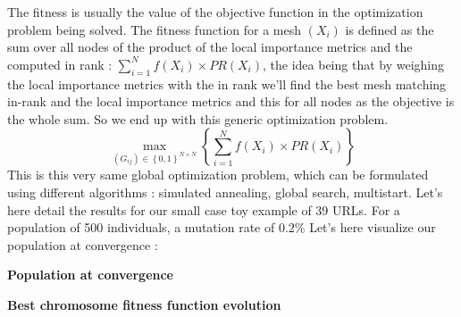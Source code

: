 \documentclass{iSWAGArticle}
\begin{document}
The fitness is usually the value of the objective function in the optimization problem being solved.
The fitness function for a mesh $\left(X_i\right)$ is defined as the sum over all nodes of the product of the local importance metrics
and the computed in rank : $\sum^{N}_{i=1} f\left(X_i\right)\times PR(X_i)$, the idea being that by weighing the local importance metrics with the in rank
we'll find the best mesh matching in-rank and the local importance metrics and this for all nodes as the objective is the whole sum. 
So we end up with this generic optimization problem.
\begin{equation}
\max_{\left(G_{ij}\right)  \in \left\{0,1\right\}^{N\times N}}\left\{ \sum^{N}_{i=1} f\left(X_i\right)\times PR(X_i)\right\}
\end{equation}
This is this very same global optimization problem, which can be formulated using different algorithms : simulated annealing, global search, multistart.
Let's here detail the results for our small case toy example of 39 URLs.
For a population of 500 individuals, a mutation rate of $0.2 \%$
Let's here visualize our population at convergence :
\begin{center}
\textbf{\large Population at convergence}
\end{center}
\begin{center}
\end{center}
\begin{center}
\textbf{\large Best chromosome fitness function evolution}
\end{center}
\begin{center}
\end{center}
\end{document}
